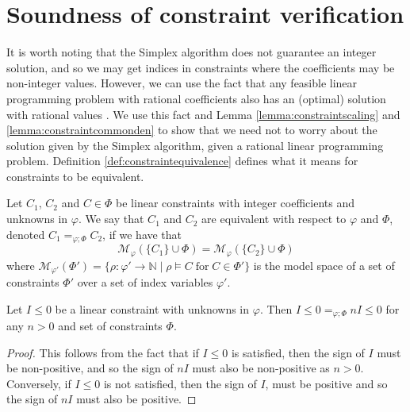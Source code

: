 \section{Soundness of constraint verification}

It is worth noting that the Simplex algorithm does not guarantee an integer solution, and so we may get indices in constraints where the coefficients may be non-integer values. However, we can use the fact that any feasible linear programming problem with rational coefficients also has an (optimal) solution with rational values \cite{keller2016applied}. We use this fact and Lemma \ref{lemma:constraintscaling} and \ref{lemma:constraintcommonden} to show that we need not to worry about the solution given by the Simplex algorithm, given a rational linear programming problem. Definition \ref{def:constraintequivalence} defines what it means for constraints to be equivalent.

\begin{defi}\label{def:constraintequivalence}
    Let $C_1$, $C_2$ and $C\in\Phi$ be linear constraints with integer coefficients and unknowns in $\varphi$. We say that $C_1$ and $C_2$ are equivalent with respect to $\varphi$ and $\Phi$, denoted $C_1 =_{\varphi;\Phi} C_2$, if we have that
    \begin{equation*}
    \mathcal{M}_\varphi(\{C_1\} \cup \Phi) = \mathcal{M}_\varphi(\{C_2\} \cup \Phi) %
\end{equation*}
where $\mathcal{M}_{\varphi'}(\Phi')=\{\rho : \varphi' \rightarrow \mathbb{N} \mid \rho \vDash C\;\text{for}\; C \in \Phi'\}$ is the model space of a set of constraints $\Phi'$ over a set of index variables $\varphi'$.
\end{defi}

\begin{lemma}\label{lemma:constraintscaling}
Let $I \leq 0$ be a linear constraint with unknowns in $\varphi$. Then $I \leq 0 =_{\varphi;\Phi} n I \leq 0$ for any $n>0$ and set of constraints $\Phi$.
\begin{proof}
    This follows from the fact that if $I \leq 0$ is satisfied, then the sign of $I$ must be non-positive, and so the sign of $n I$ must also be non-positive as $n > 0$. Conversely, if $I \leq 0$ is not satisfied, then the sign of $I$, must be positive and so the sign of $n I$ must also be positive.
\end{proof}
\end{lemma}

